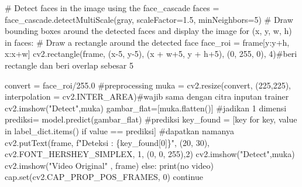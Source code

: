 \documentclass[
  letterpaper,
  DIV=11,
  numbers=noendperiod]{scrreprt}
\newenvironment{Shaded}{\begin{snugshade}}{\end{snugshade}}
\newcommand{\BuiltInTok}[1]{\textcolor[rgb]{0.00,0.23,0.31}{#1}}
\newcommand{\CommentTok}[1]{\textcolor[rgb]{0.37,0.37,0.37}{#1}}
\newcommand{\ControlFlowTok}[1]{\textcolor[rgb]{0.00,0.23,0.31}{#1}}
\newcommand{\DecValTok}[1]{\textcolor[rgb]{0.68,0.00,0.00}{#1}}
\newcommand{\FloatTok}[1]{\textcolor[rgb]{0.68,0.00,0.00}{#1}}
\newcommand{\KeywordTok}[1]{\textcolor[rgb]{0.00,0.23,0.31}{#1}}
\newcommand{\NormalTok}[1]{\textcolor[rgb]{0.00,0.23,0.31}{#1}}
\newcommand{\OperatorTok}[1]{\textcolor[rgb]{0.37,0.37,0.37}{#1}}
\newcommand{\SpecialCharTok}[1]{\textcolor[rgb]{0.37,0.37,0.37}{#1}}
\newcommand{\SpecialStringTok}[1]{\textcolor[rgb]{0.13,0.47,0.30}{#1}}
\newcommand{\StringTok}[1]{\textcolor[rgb]{0.13,0.47,0.30}{#1}}
\begin{document}
\begin{Shaded}
\begin{Highlighting}[]
        \CommentTok{\# Detect faces in the image using the face\_cascade}
\NormalTok{        faces }\OperatorTok{=}\NormalTok{ face\_cascade.detectMultiScale(gray, scaleFactor}\OperatorTok{=}\FloatTok{1.5}\NormalTok{, minNeighbors}\OperatorTok{=}\DecValTok{5}\NormalTok{)}
        \CommentTok{\# Draw bounding boxes around the detected faces and display the image}
        \ControlFlowTok{for}\NormalTok{ (x, y, w, h) }\KeywordTok{in}\NormalTok{ faces:}
            \CommentTok{\# Draw a rectangle around the detected face}
\NormalTok{            face\_roi }\OperatorTok{=}\NormalTok{ frame[y:y}\OperatorTok{+}\NormalTok{h, x:x}\OperatorTok{+}\NormalTok{w]}
\NormalTok{            cv2.rectangle(frame, (x}\OperatorTok{{-}}\DecValTok{5}\NormalTok{, y}\OperatorTok{{-}}\DecValTok{5}\NormalTok{), (x }\OperatorTok{+}\NormalTok{ w}\OperatorTok{+}\DecValTok{5}\NormalTok{, y }\OperatorTok{+}\NormalTok{ h}\OperatorTok{+}\DecValTok{5}\NormalTok{), (}\DecValTok{0}\NormalTok{, }\DecValTok{255}\NormalTok{, }\DecValTok{0}\NormalTok{), }\DecValTok{4}\NormalTok{)}\CommentTok{\#beri rectangle dan beri overlap sebesar 5}

\NormalTok{            convert }\OperatorTok{=}\NormalTok{ face\_roi}\OperatorTok{/}\FloatTok{255.0} \CommentTok{\#preprocessing}
\NormalTok{            muka }\OperatorTok{=}\NormalTok{ cv2.resize(convert, (}\DecValTok{225}\NormalTok{,}\DecValTok{225}\NormalTok{), interpolation }\OperatorTok{=}\NormalTok{ cv2.INTER\_AREA)}\CommentTok{\#wajib sama dengan citra inputan trainer}
\NormalTok{            cv2.imshow(}\StringTok{"Detect"}\NormalTok{,muka)}
\NormalTok{            gambar\_flat}\OperatorTok{=}\NormalTok{[muka.flatten()] }\CommentTok{\#jadikan 1 dimensi}
\NormalTok{            prediksi}\OperatorTok{=}\NormalTok{ model.predict(gambar\_flat) }\CommentTok{\#prediksi}
\NormalTok{            key\_found }\OperatorTok{=}\NormalTok{ [key }\ControlFlowTok{for}\NormalTok{ key, value }\KeywordTok{in}\NormalTok{ label\_dict.items() }\ControlFlowTok{if}\NormalTok{ value }\OperatorTok{==}\NormalTok{ prediksi] }\CommentTok{\#dapatkan namanya}
\NormalTok{            cv2.putText(frame, }\SpecialStringTok{f"Deteksi : }\SpecialCharTok{\{}\NormalTok{key\_found[}\DecValTok{0}\NormalTok{]}\SpecialCharTok{\}}\SpecialStringTok{"}\NormalTok{, (}\DecValTok{20}\NormalTok{, }\DecValTok{30}\NormalTok{), cv2.FONT\_HERSHEY\_SIMPLEX, }\DecValTok{1}\NormalTok{, (}\DecValTok{0}\NormalTok{, }\DecValTok{0}\NormalTok{, }\DecValTok{255}\NormalTok{),}\DecValTok{2}\NormalTok{)}
\NormalTok{            cv2.imshow(}\StringTok{"Detect"}\NormalTok{,muka)}
\NormalTok{        cv2.imshow(}\StringTok{"Video Original"}\NormalTok{ , frame)}
    \ControlFlowTok{else}\NormalTok{:}
        \BuiltInTok{print}\NormalTok{(}\StringTok{\textquotesingle{}no video\textquotesingle{}}\NormalTok{)}
\NormalTok{        cap.}\BuiltInTok{set}\NormalTok{(cv2.CAP\_PROP\_POS\_FRAMES, }\DecValTok{0}\NormalTok{)}
        \ControlFlowTok{continue}


\end{Highlighting}
\end{Shaded}
\end{document}
